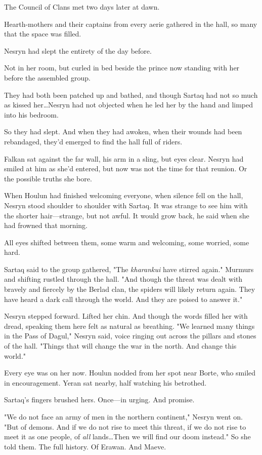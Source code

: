 The Council of Clans met two days later at dawn.

Hearth-mothers and their captains from every aerie gathered in the hall, so many that the space was filled.

Nesryn had slept the entirety of the day before.

Not in her room, but curled in bed beside the prince now standing with her before the assembled group.

They had both been patched up and bathed, and though Sartaq had not so much as kissed her\ldots Nesryn had not objected when he led her by the hand and limped into his bedroom.

So they had slept.
And when they had awoken, when their wounds had been rebandaged, they'd emerged to find the hall full of riders.

Falkan sat against the far wall, his arm in a sling, but eyes clear.
Nesryn had smiled at him as she'd entered, but now was not the time for that reunion.
Or the possible truths she bore.

When Houlun had finished welcoming everyone, when silence fell on the hall, Nesryn stood shoulder to shoulder with Sartaq.
It was strange to see him with the shorter hair---strange, but not awful.
It would grow back, he said when she had frowned that morning.

All eyes shifted between them, some warm and welcoming, some worried, some hard.

Sartaq said to the group gathered, "The \emph{kharankui} have stirred again."
Murmurs and shifting rustled through the hall.
"And though the threat was dealt with bravely and fiercely by the Berlad clan, the spiders will likely return again.
They have heard a dark call through the world.
And they are poised to answer it."

Nesryn stepped forward.
Lifted her chin.
And though the words filled her with dread, speaking them here felt as natural as breathing.
"We learned many things in the Pass of Dagul," Nesryn said, voice ringing out across the pillars and stones of the hall.
"Things that will change the war in the north.
And change this world."

Every eye was on her now.
Houlun nodded from her spot near Borte, who smiled in encouragement.
Yeran sat nearby, half watching his betrothed.

Sartaq's fingers brushed hers.
Once---in urging.
And promise.

"We do not face an army of men in the northern continent," Nesryn went on.
"But of demons.
And if we do not rise to meet this threat, if we do not rise to meet it as one people, of \emph{all} lands\ldots Then we will find our doom instead."
So she told them.
The full history.
Of Erawan.
And Maeve.

